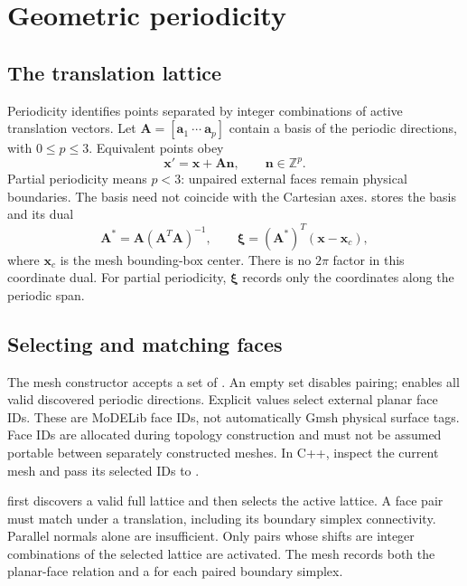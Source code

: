 \section{Geometric periodicity}\label{sec:periodicity}
\subsection{The translation lattice}
Periodicity identifies points separated by integer combinations of active translation vectors. Let $\bm A=[\bm a_1\ \cdots\ \bm a_p]$ contain a basis of the periodic directions, with $0\le p\le3$. Equivalent points obey
\begin{equation}
\bm x' = \bm x+\bm A\bm n,\qquad \bm n\in\mathbb Z^p.
\end{equation}
Partial periodicity means $p<3$: unpaired external faces remain physical boundaries. The basis need not coincide with the Cartesian axes.  stores the basis and its dual
\begin{equation}
\bm A^*=\bm A(\bm A^T\bm A)^{-1},\qquad
\bm\xi=(\bm A^*)^T(\bm x-\bm x_c),
\end{equation}
where $\bm x_c$ is the mesh bounding-box center. There is no $2\pi$ factor in this coordinate dual. For partial periodicity, $\bm\xi$ records only the coordinates along the periodic span.

\subsection{Selecting and matching faces}
The mesh constructor accepts a set of . An empty set disables pairing;  enables all valid discovered periodic directions. Explicit values select external planar face IDs. These are MoDELib face IDs, not automatically Gmsh physical surface tags. Face IDs are allocated during topology construction and must not be assumed portable between separately constructed meshes. In C++, inspect the current mesh and pass its selected IDs to .

 first discovers a valid full lattice and then selects the active lattice. A face pair must match under a translation, including its boundary simplex connectivity. Parallel normals alone are insufficient. Only pairs whose shifts are integer combinations of the selected lattice are activated. The mesh records both the planar-face relation and a  for each paired boundary simplex.


